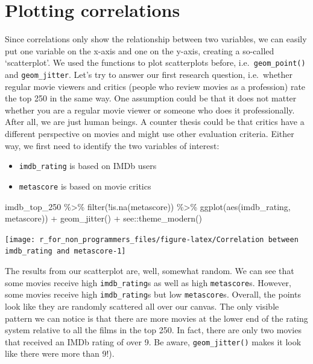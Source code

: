 \documentclass[
]{book}
\newenvironment{Shaded}{\begin{snugshade}}{\end{snugshade}}
\newcommand{\FunctionTok}[1]{\textcolor[rgb]{0.00,0.00,0.00}{#1}}
\newcommand{\NormalTok}[1]{#1}
\newcommand{\SpecialCharTok}[1]{\textcolor[rgb]{0.00,0.00,0.00}{#1}}
\begin{document}
\hypertarget{plotting-correlations}{%
\section{Plotting correlations}\label{plotting-correlations}}

Since correlations only show the relationship between two variables, we can easily put one variable on the x-axis and one on the y-axis, creating a so-called `scatterplot'. We used the functions to plot scatterplots before, i.e.~\texttt{geom\_point()} and \texttt{geom\_jitter}. Let's try to answer our first research question, i.e.~whether regular movie viewers and critics (people who review movies as a profession) rate the top 250 in the same way. One assumption could be that it does not matter whether you are a regular movie viewer or someone who does it professionally. After all, we are just human beings. A counter thesis could be that critics have a different perspective on movies and might use other evaluation criteria. Either way, we first need to identify the two variables of interest:

\begin{itemize}
\item
  \texttt{imdb\_rating} is based on IMDb users
\item
  \texttt{metascore} is based on movie critics
\end{itemize}

\begin{Shaded}
\begin{Highlighting}[]
\NormalTok{imdb\_top\_250 }\SpecialCharTok{\%\textgreater{}\%}
  \FunctionTok{filter}\NormalTok{(}\SpecialCharTok{!}\FunctionTok{is.na}\NormalTok{(metascore)) }\SpecialCharTok{\%\textgreater{}\%}
  \FunctionTok{ggplot}\NormalTok{(}\FunctionTok{aes}\NormalTok{(imdb\_rating, metascore)) }\SpecialCharTok{+}
  \FunctionTok{geom\_jitter}\NormalTok{() }\SpecialCharTok{+}
\NormalTok{  see}\SpecialCharTok{::}\FunctionTok{theme\_modern}\NormalTok{()}
\end{Highlighting}
\end{Shaded}

\begin{center}\texttt{[image: r\_for\_non\_programmers\_files/figure-latex/Correlation between imdb\_rating and metascore-1]} \end{center}

The results from our scatterplot are, well, somewhat random. We can see that some movies receive high \texttt{imdb\_rating}s as well as high \texttt{metascore}s. However, some movies receive high \texttt{imdb\_rating}s but low \texttt{metascore}s. Overall, the points look like they are randomly scattered all over our canvas. The only visible pattern we can notice is that there are more movies at the lower end of the rating system relative to all the films in the top 250. In fact, there are only two movies that received an IMDb rating of over 9. Be aware, \texttt{geom\_jitter()} makes it look like there were more than 9!).
\end{document}
